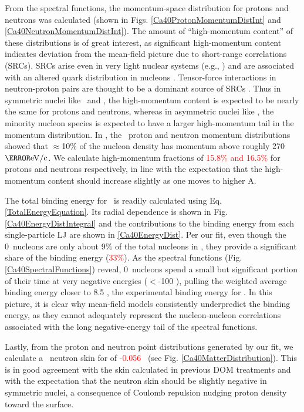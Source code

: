 From the spectral functions, the momentum-space distribution for protons and neutrons was
calculated (shown in Figs. \ref{Ca40ProtonMomentumDistInt} and
\ref{Ca40NeutronMomentumDistInt}). 
The amount of ``high-momentum content'' of
these distributions is of great interest, as significant high-momentum content 
indicates deviation from the mean-field picture due to short-range correlations (SRCs). SRCs arise 
even in very light nuclear systems (e.g., \heFour)
and are associated with an altered quark distribution in nucleons 
\cite{Hen2012, Arrington2012, CLAS2019}.
Tensor-force interactions in neutron-proton pairs are thought to be a dominant source of 
SRCs \cite{Subedi2008}. Thus in symmetric nuclei like \cTwelve\ and \caForty, the
high-momentum content is expected to be nearly the same for protons and neutrons, whereas in
asymmetric nuclei like \pbEight, the minority nucleon species is expected to have a larger
high-momentum tail in the momentum distribution. In \cite{Rohe2004}, the \cTwelve\ proton and
neutron momentum distributions showed that $\approx$10\% of the nucleon density
has momentum above roughly 270 $\mega\electronvolt/\text{c}$.
We calculate high-momentum fractions of \textcolor{red}{15.8\% and 16.5\%}
for protons and neutrons respectively, in line with the expectation that the high-momentum content
should increase slightly as one moves to higher A.

The total binding energy for \caForty\ is readily calculated using Eq.
\ref{TotalEnergyEquation}. Its radial dependence is shown in Fig.
\ref{Ca40EnergyDistIntegral} and the
contributions to the binding energy from each single-particle LJ are shown in
\ref{Ca40EnergyDist}. Per our fit, even though the 0\sOne\ nucleons are
only about 9\% of the total nucleons in \caForty, they provide a significant
share of the binding
energy (\textcolor{red}{33\%}). As the spectral
functions (Fig. \ref{Ca40SpectralFunctions}) reveal, 0\sOne\ nucleons spend a small but significant portion of their time 
at very negative energies ($<$-100 \mega\electronvolt), pulling the weighted average binding energy 
closer to 8.5 \mega\electronvolt{}, the experimental binding energy for \caForty. In this
picture, it is clear why mean-field models consistently underpredict the binding energy, as they
cannot adequately represent the nucleon-nucleon correlations associated with the long
negative-energy tail of the spectral functions.

Lastly, from the proton and neutron point distributions generated by our fit, we calculate a
\caForty\ neutron skin for of \textcolor{red}{-0.056} \femto\meter\ (see Fig. \ref{Ca40MatterDistribution}). 
This is in good agreement with the skin calculated in previous DOM treatments
\cite{MahzoonPhDThesis} and with the expectation that the neutron skin should be slightly negative in
symmetric nuclei, a consequence of Coulomb repulsion nudging proton density toward the surface.

